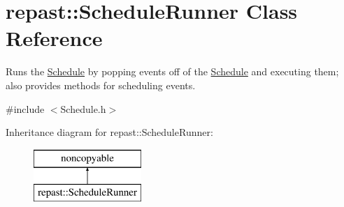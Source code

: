 \hypertarget{classrepast_1_1_schedule_runner}{\section{repast\-:\-:Schedule\-Runner Class Reference}
\label{classrepast_1_1_schedule_runner}
}


Runs the \hyperlink{classrepast_1_1_schedule}{Schedule} by popping events off of the \hyperlink{classrepast_1_1_schedule}{Schedule} and executing them; also provides methods for scheduling events.  




{\ttfamily \#include $<$Schedule.\-h$>$}

Inheritance diagram for repast\-:\-:Schedule\-Runner\-:\begin{figure}[H]
\begin{center}
\leavevmode
\includegraphics[height=2.000000cm]{classrepast_1_1_schedule_runner}
\end{center}
\end{figure}
